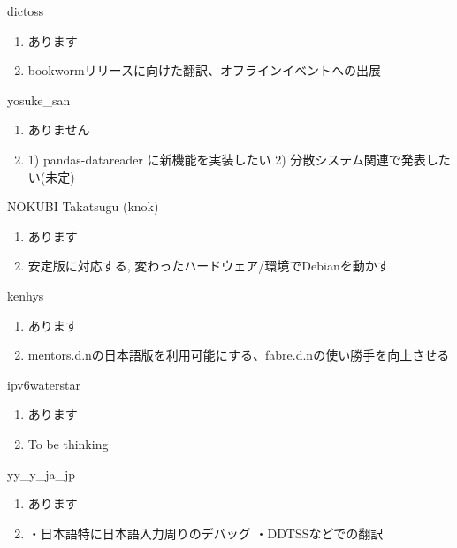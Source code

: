 \begin{prework}{ dictoss }
  \begin{enumerate}
  \item あります
  \item bookwormリリースに向けた翻訳、オフラインイベントへの出展
  \end{enumerate}
\end{prework}

\begin{prework}{ yosuke\_san }
  \begin{enumerate}
  \item ありません
  \item 1) pandas-datareader に新機能を実装したい 2) 分散システム関連で発表したい(未定)
  \end{enumerate}
\end{prework}

\begin{prework}{ NOKUBI Takatsugu (knok) }
  \begin{enumerate}
  \item あります
  \item 安定版に対応する, 変わったハードウェア/環境でDebianを動かす
  \end{enumerate}
\end{prework}

\begin{prework}{ kenhys }
  \begin{enumerate}
  \item あります
  \item mentors.d.nの日本語版を利用可能にする、fabre.d.nの使い勝手を向上させる
  \end{enumerate}
\end{prework}

\begin{prework}{ ipv6waterstar }
  \begin{enumerate}
  \item あります
  \item To be thinking
  \end{enumerate}
\end{prework}

\begin{prework}{ yy\_y\_ja\_jp }
  \begin{enumerate}
  \item あります
  \item ・日本語特に日本語入力周りのデバッグ ・DDTSSなどでの翻訳
  \end{enumerate}
\end{prework}

